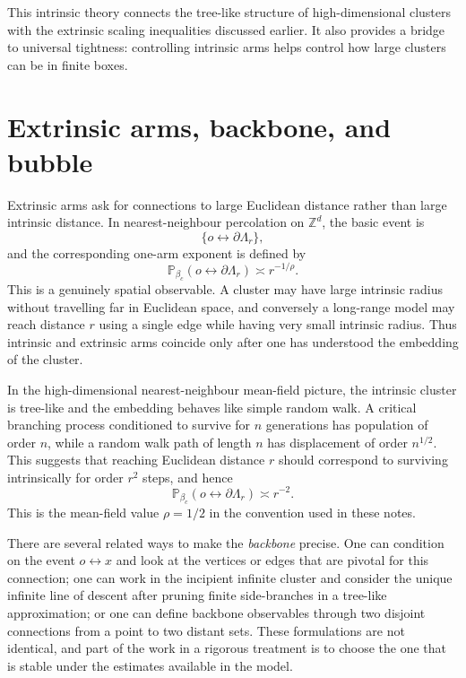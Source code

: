 \documentclass[11pt,reqno]{book}
\numberwithin{equation}{chapter}
\theoremstyle{plain}
\theoremstyle{definition}
\theoremstyle{remark}
\renewcommand{\P}{\mathbb P}
\newcommand{\1}{\mathbf 1}
\begin{document}
This intrinsic theory connects the tree-like structure of high-dimensional clusters with the extrinsic scaling inequalities discussed earlier. It also provides a bridge to universal tightness: controlling intrinsic arms helps control how large clusters can be in finite boxes.

\section{Extrinsic arms, backbone, and bubble}

Extrinsic arms ask for connections to large Euclidean distance rather than large intrinsic distance. In nearest-neighbour percolation on \(\mathbb Z^d\), the basic event is
\[
  \{o\leftrightarrow \partial \Lambda_r\},
\]
and the corresponding one-arm exponent is defined by
\[
  \P_{\beta_c}(o\leftrightarrow \partial\Lambda_r)\asymp r^{-1/\rho}.
\]
This is a genuinely spatial observable. A cluster may have large intrinsic radius without travelling far in Euclidean space, and conversely a long-range model may reach distance \(r\) using a single edge while having very small intrinsic radius. Thus intrinsic and extrinsic arms coincide only after one has understood the embedding of the cluster.

In the high-dimensional nearest-neighbour mean-field picture, the intrinsic cluster is tree-like and the embedding behaves like simple random walk. A critical branching process conditioned to survive for \(n\) generations has population of order \(n\), while a random walk path of length \(n\) has displacement of order \(n^{1/2}\). This suggests that reaching Euclidean distance \(r\) should correspond to surviving intrinsically for order \(r^2\) steps, and hence
\[
  \P_{\beta_c}(o\leftrightarrow \partial\Lambda_r)\asymp r^{-2}.
\]
This is the mean-field value \(\rho=1/2\) in the convention used in these notes.

There are several related ways to make the \emph{backbone} precise. One can condition on the event \(o\leftrightarrow x\) and look at the vertices or edges that are pivotal for this connection; one can work in the incipient infinite cluster and consider the unique infinite line of descent after pruning finite side-branches in a tree-like approximation; or one can define backbone observables through two disjoint connections from a point to two distant sets. These formulations are not identical, and part of the work in a rigorous treatment is to choose the one that is stable under the estimates available in the model.
\end{document}
